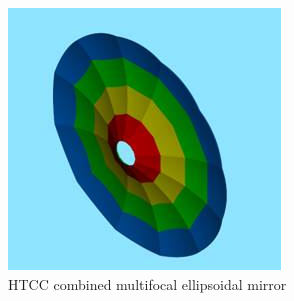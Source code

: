 \begin{figure}[ht]
    \centering
    \includegraphics[width=1.0\linewidth,trim={0 0cm 0 0},clip]{images/Colored_Mirror.jpg}
    \caption{HTCC combined multifocal ellipsoidal  mirror}
    \label{fig:Colored_Mirror}
\end{figure}


